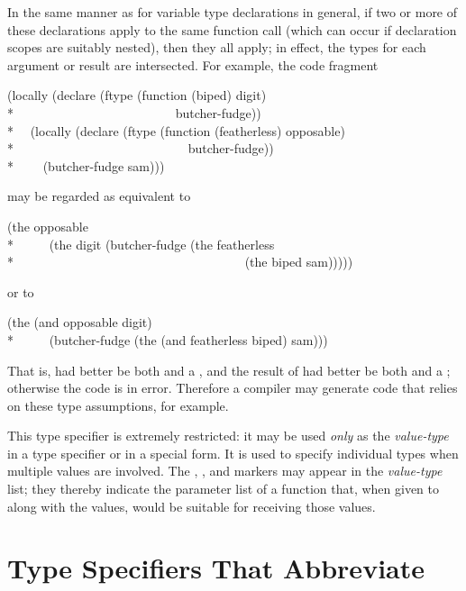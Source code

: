 \begin{flushdesc}
\begin{new}
In the same manner as for variable type declarations in general,
if two or more
of these declarations apply to the same function call (which can
occur if declaration scopes are suitably nested), then they all apply;
in effect, the types for each argument or result are intersected.
For example, the code fragment
\begin{lisp}
(locally (declare (ftype (function (biped) digit) \\*
~~~~~~~~~~~~~~~~~~~~~~~~~butcher-fudge)) \\*
~~(locally (declare (ftype (function (featherless) opposable) \\*
~~~~~~~~~~~~~~~~~~~~~~~~~~~butcher-fudge)) \\*
~~~~(butcher-fudge sam)))
\end{lisp}
may be regarded as equivalent to
\begin{lisp}
(the opposable \\*
~~~~~(the digit (butcher-fudge (the featherless \\*
~~~~~~~~~~~~~~~~~~~~~~~~~~~~~~~~~~~~(the biped sam)))))
\end{lisp}
or to
\begin{lisp}
(the (and opposable digit) \\*
~~~~~(butcher-fudge (the (and featherless biped) sam)))
\end{lisp}
That is,  had better be both  and a ,
and the result of  had better be both
 and a ; otherwise the code is in error.
Therefore a compiler may generate code that relies on these type assumptions,
for example.
\end{new}


\item[\cd{(values {\it value1-type} {\it value2-type} ...)}]
This type specifier is extremely restricted: it may be used {\it only}
as the {\it value-type} in a  type specifier or in
a  special form.  It is used to specify individual types when
multiple values are involved.
The
, , and  markers may appear in the {\it value-type} list;
they thereby indicate the parameter list of a
function that, when given to  along with
the values, would be suitable for receiving those values.
\end{flushdesc}


\section{Type Specifiers That Abbreviate}

